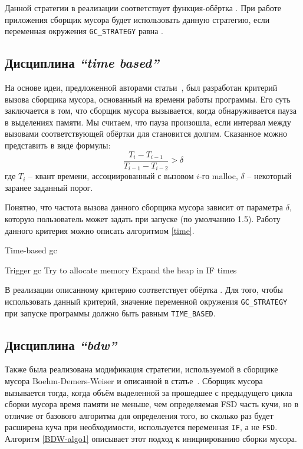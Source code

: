 \documentclass[14pt]{extarticle}
\begin{document}
Данной стратегии в реализации соответствует функция-обёртка .
При работе приложения сборщик мусора будет использовать данную стратегию,
если переменная окружения \texttt{GC\_STRATEGY} равна .


\subsection{Дисциплина \textit{``time based''}}

На основе идеи, предложенной авторами статьи~\cite{microphase}, был разработан критерий
вызова сборщика мусора, основанный на времени работы программы. Его суть заключается
в том, что сборщик мусора вызывается, когда обнаруживается пауза в выделениях памяти.
Мы считаем, что пауза произошла, если интервал между вызовами соответствующей обёртки для 
становится долгим. Сказанное можно представить в виде формулы:
    $$\frac {T_i - T_{i-1}} {T_{i-1} - T_{i-2}} > \delta $$ 
    где $T_{i}$ -- квант времени, ассоциированный с вызовом $i$-го malloc, $\delta$ -- некоторый 
    заранее заданный порог.

Понятно, что частота вызова данного сборщика мусора зависит от параметра $\delta$, 
которую пользователь может задать при запуске (по умолчанию 1.5).
Работу данного критерия можно описать алгоритмом \ref{time}. 

\begin{algorithm}
\caption{Time-based gc}
\label{time}
\begin{algorithmic}[3]
    \State Trigger gc
\EndIf
\State Try to allocate memory
    \State Expand the heap in IF times
\EndIf

\end{algorithmic}
\end{algorithm}

В реализации описанному критерию соответствует обёртка . Для того, чтобы использовать
данный критерий, значение переменной окружения \texttt{GC\_STRATEGY} при запуске программы должно быть 
равным \texttt{TIME\_BASED}.

\subsection{Дисциплина \textit{``bdw''}} 

Также была реализована модификация стратегии, используемой в сборщике мусора 
Boehm-Demers-Weiser и описанной в статье~\cite{BDW}. 
Сборщик мусора вызывается тогда, когда объём выделенной за прошедшее с предыдущего
цикла сборки мусора
время памяти не меньше, чем определяемая FSD часть кучи, но в отличие от 
базового алгоритма для определения того, во сколько раз будет расширена куча 
при необходимости, используется переменная \texttt{IF}, а не \texttt{FSD}. Алгоритм \ref{BDW-algo1}
описывает этот подход к инициированию сборки мусора. 
\end{document}
